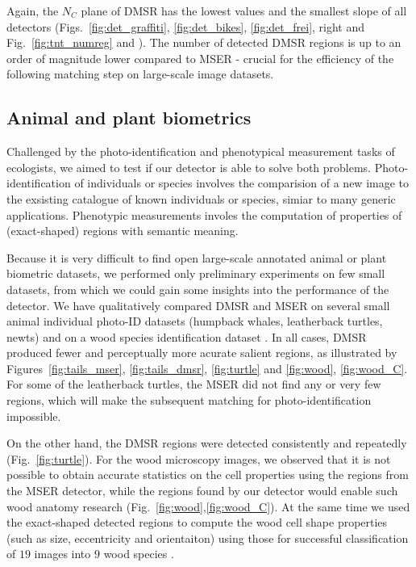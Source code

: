 \documentclass[conference,compsoc]{IEEEtran}
\begin{document}
Again, the $N_C$ plane of DMSR has the lowest values and the smallest slope of all detectors (Figs.~\ref{fig:det_graffiti}, \ref{fig:det_bikes}, \ref{fig:det_frei}, right and Fig.~\ref{fig:tnt_numreg} and \cite{elena_ranguelova_2016_45156}). The number of detected DMSR regions is up to an order of magnitude lower compared to MSER - crucial for the efficiency of the following matching step on large-scale image datasets.

\subsection{Animal and plant biometrics}
\label{ssec:bio}
Challenged by the photo-identification and phenotypical measurement tasks of ecologists, we aimed to test if our detector is able to solve both problems. Photo-identification of individuals or species involves the comparision of a new image to the exsisting catalogue of known individuals or species, simiar to many generic applications. Phenotypic measurements involes the computation of properties of (exact-shaped) regions with semantic meaning.

Because it is very difficult to find open large-scale annotated animal or plant biometric datasets, we performed only preliminary experiments on few small datasets, from which we could gain some insights into the performance of the detector. We have qualitatively compared DMSR and MSER on several small animal individual photo-ID datasets (humpback whales, leatherback turtles, newts) and on a wood species identification dataset \cite{RangHumpb06, PauwelsZB08, wood}. In all cases, DMSR produced fewer and perceptually more acurate salient regions, as illustrated by Figures~\ref{fig:tails_mser}, \ref{fig:tails_dmsr}, \ref{fig:turtle} and \ref{fig:wood}, \ref{fig:wood_C}. For some of the leatherback turtles, the MSER did not find any or very few regions, which will make the subsequent matching for photo-identification impossible. 

On the other hand, the DMSR regions were detected consistently and repeatedly (Fig.~\ref{fig:turtle}). For the wood microscopy images, we observed that it is not possible to obtain accurate statistics on the cell properties using the regions from the MSER detector, while the regions found by our detector would enable such wood anatomy research (Fig.~\ref{fig:wood},\ref{fig:wood_C}). At the same time we used the exact-shaped detected regions to compute the wood cell shape properties (such as size, eccentricity and orientaiton) using those for successful classification of $19$ images into $9$ wood species \cite{elena_ranguelova_wood}. 
\end{document}
